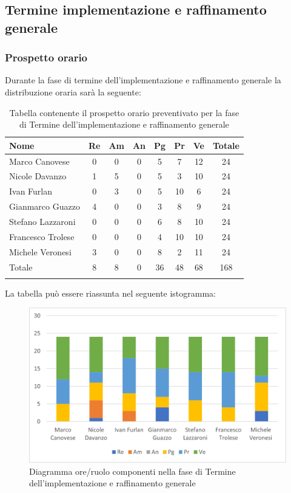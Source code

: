 			\subsection{Termine implementazione e raffinamento generale}
            \subsubsection{Prospetto orario}
			Durante la fase di termine dell'implementazione e raffinamento generale la distribuzione oraria sarà la seguente:
			
			\begin{longtable}{|l|c|c|c|c|c|c|c|}
				\hline
				\rowcolor{lighter-grayer}
				\textbf{Nome} & \textbf{Re} & \textbf{Am} & \textbf{An} & \textbf{Pg}  & \textbf{Pr}   & \textbf{Ve} & \textbf{Totale} \\
				\hline
				\endfirsthead
				
				\hline
				Marco Canovese & 0 & 0 & 0 & 5 & 7 & 12 & 24\\
				\hline
				\hline
				Nicole Davanzo & 1 & 5 & 0 & 5 & 3 & 10 & 24\\
				\hline
				\hline
				Ivan Furlan & 0 & 3 & 0 & 5 & 10 & 6 & 24\\
				\hline
				\hline
				Gianmarco Guazzo & 4 & 0 & 0 & 3 & 8 & 9 & 24\\
				\hline
				\hline
				Stefano Lazzaroni & 0 & 0 & 0 & 6 & 8 & 10 & 24\\
				\hline
				\hline
				Francesco Trolese & 0 & 0 & 0 & 4 & 10 & 10 & 24\\
				\hline
				\hline
				Michele Veronesi & 3 & 0 & 0 & 8 & 2 & 11 & 24\\
				\hline 
				\hline
				Totale & 8 & 8 & 0 & 36 & 48 & 68 & 168\\
				\hline
				\rowcolor{white}
				\caption{Tabella contenente il prospetto orario preventivato per la fase di Termine dell'implementazione e raffinamento generale}
			\end{longtable}

		
			La tabella può essere riassunta nel seguente istogramma:
		
			\begin{figure}[H]
				\centering
				\includegraphics[width=0.8\linewidth]{res/images/preventivo/6-1.png}
				\caption{Diagramma ore/ruolo componenti nella fase di Termine dell'implementazione e raffinamento generale}
				\label{fig:diagramma suddivisione ruoli fase Termine dell'implementazione e raffinamento generale}
			\end{figure}
		
